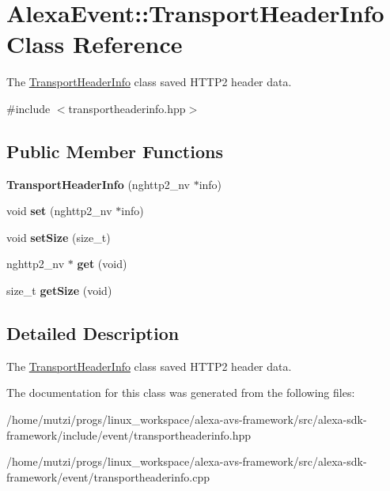 \hypertarget{classAlexaEvent_1_1TransportHeaderInfo}{}\section{Alexa\+Event\+:\+:Transport\+Header\+Info Class Reference}
\label{classAlexaEvent_1_1TransportHeaderInfo}


The \hyperlink{classAlexaEvent_1_1TransportHeaderInfo}{Transport\+Header\+Info} class saved H\+T\+T\+P2 header data.  




{\ttfamily \#include $<$transportheaderinfo.\+hpp$>$}

\subsection*{Public Member Functions}
\begin{DoxyCompactItemize}
\item 
\mbox{\label{classAlexaEvent_1_1TransportHeaderInfo_a7e25b9cca3c466ba7dda4472bb1f7898}} 
{\bfseries Transport\+Header\+Info} (nghttp2\+\_\+nv $\ast$info)
\item 
\mbox{\label{classAlexaEvent_1_1TransportHeaderInfo_ad1325ea070c9c9c804320b5fd7569972}} 
void {\bfseries set} (nghttp2\+\_\+nv $\ast$info)
\item 
\mbox{\label{classAlexaEvent_1_1TransportHeaderInfo_a5f4e0821817546d9dacd40639a4903a8}} 
void {\bfseries set\+Size} (size\+\_\+t)
\item 
\mbox{\label{classAlexaEvent_1_1TransportHeaderInfo_accb31876bf664c1ac4916ad68d4e2e84}} 
nghttp2\+\_\+nv $\ast$ {\bfseries get} (void)
\item 
\mbox{\label{classAlexaEvent_1_1TransportHeaderInfo_a00982db604f0c006d7e39b099eb5d8a5}} 
size\+\_\+t {\bfseries get\+Size} (void)
\end{DoxyCompactItemize}


\subsection{Detailed Description}
The \hyperlink{classAlexaEvent_1_1TransportHeaderInfo}{Transport\+Header\+Info} class saved H\+T\+T\+P2 header data. 

The documentation for this class was generated from the following files\+:\begin{DoxyCompactItemize}
\item 
/home/mutzi/progs/linux\+\_\+workspace/alexa-\/avs-\/framework/src/alexa-\/sdk-\/framework/include/event/transportheaderinfo.\+hpp\item 
/home/mutzi/progs/linux\+\_\+workspace/alexa-\/avs-\/framework/src/alexa-\/sdk-\/framework/event/transportheaderinfo.\+cpp\end{DoxyCompactItemize}
